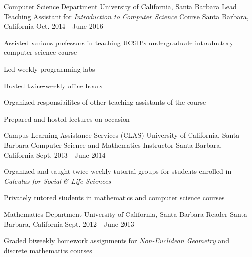 \begin{cventries}
  \cventry
{Computer Science Department \newline University of California, Santa Barbara}
    {Lead Teaching Assistant for \emph{Introduction to Computer Science} Course}
    {Santa Barbara, California}
    {Oct. 2014 - June 2016}
    {
      \begin{cvitems}
	\item {Assisted various professors in teaching UCSB's undergraduate introductory computer science course}
        \item {Led weekly programming labs}
        \item {Hosted twice-weekly office hours}
        \item {Organized responsibilites of other teaching assistants of the course}
	\item {Prepared and hosted lectures on occasion}
      \end{cvitems}
    }

  \cventry
{Campus Learning Assistance Services (CLAS) \newline University of California, Santa Barbara}
    {Computer Science and Mathematics Instructor}
    {Santa Barbara, California}
    {Sept. 2013 - June 2014}
    {
      \begin{cvitems}
	\item {Organized and taught twice-weekly tutorial groups for students enrolled in \emph{Calculus for Social \& Life Sciences}}
        \item {Privately tutored students in mathematics and computer science courses}
      \end{cvitems}
    }

  \cventry
{Mathematics Department \newline University of California, Santa Barbara}
    {Reader}
    {Santa Barbara, California}
    {Sept. 2012 - June 2013}
    {
      \begin{cvitems}
	\item {Graded biweekly homework assignments for \emph{Non-Euclidean Geometry} and discrete mathematics courses}
      \end{cvitems}
    }



  \end{cventries}
